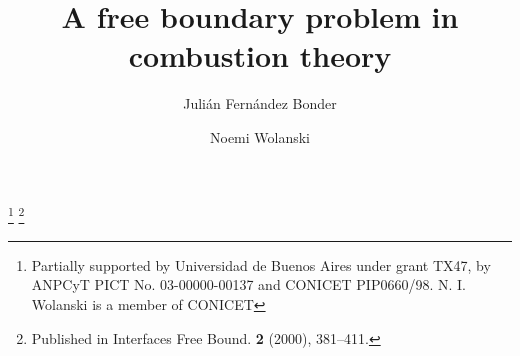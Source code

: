
\vsize=27.9cm
\hsize=21cm
\setlength{\textwidth}{16cm}
\setlength{\textheight}{21.5cm}
\setlength{\oddsidemargin}{0.0cm}
\setlength{\evensidemargin}{0.0cm}
\parskip 6pt
\newcommand{\ve}{\varepsilon}
\newcommand{\car}{{\cal X}}
\newcommand{\R}{{\Bbb R}}
\newcommand{\cald}{{\cal D}}
\newcommand{\bep}{{\cal B}_\ve}
\newcommand{\wep}{w^\ve}
\newcommand{\uep}{u^\ve}
\newcommand{\vep}{v^\ve}
\newcommand{\uepk}{u^{\ve_k}}
\newcommand{\vepk}{v^{\ve_k}}
\newcommand{\wepk}{w^{\ve_k}}
\newcommand{\ep}{\varepsilon}
\newcommand{\epk}{{\ve_k}}
\newcommand{\epn}{\ve_{n}}
\newcommand{\epnk}{\ve_{n_k}}
\newcommand{\uepn}{u^{\ve_{n}}}
\newcommand{\uepnk}{u^{\ve_{n_k}}}
\newcommand{\uepkn}{u^{\ve_{k_n}}}
\newcommand{\vepkn}{v^{\ve_{k_n}}}
\newcommand{\wepkn}{w^{\ve_{k_n}}}
\newcommand{\epkn}{{\ve_{k_n}}}
\newcommand{\bepk}{{\cal B}_{\epk}}
\newcommand{\uepj}{u^{\ve_j}}
\newcommand{\vepj}{v^{\ve_j}}
\newcommand{\wepj}{w^{\ve_j}}
\newcommand{\epj}{{\ve_j}}
\newcommand{\bepj}{{\cal B}_{\epj}}
\newcommand{\vepjn}{v^{\ve_{j_n}}}
\newcommand{\uepjn}{u^{\ve_{j_n}}}
\newcommand{\wepjn}{w^{\ve_{j_n}}}
\newcommand{\epjn}{{\ve_{j_n}}}
\newcommand{\vepjk}{v^{\ve_{j_k}}}
\newcommand{\uepjk}{u^{\ve_{j_k}}}
\newcommand{\wepjk}{w^{\ve_{j_k}}}
\newcommand{\epjk}{{\ve_{j_k}}}
\newcommand{\pepj}{P_{\ve_j}}
\newtheorem{defi}{Definition}[section]
\newtheorem{lema}{Lemma}[section]
\newtheorem{cor}{Corollary}[section]
\newtheorem{prop}{Proposition}[section]
\newtheorem{teo}{Theorem}[section]
\newtheorem{rem}{Remark}[section]
\newtheorem{ack}{Acknowledgements}
\renewcommand{\theack}{}
\renewcommand{\theequation}{\arabic{section}.\arabic{equation}}



\title{\bf A free boundary problem in combustion theory}

\author[J. Fernandez Bonder]{Juli\'an Fern\'andez Bonder}
\author[N. Wolanski]{Noemi  Wolanski}
\thanks{Partially supported by Universidad de Buenos Aires under grant TX47,
by ANPCyT PICT No. 03-00000-00137 and CONICET PIP0660/98.
N. I. Wolanski is a member of CONICET}
\thanks{Published in Interfaces Free Bound. {\bf 2} (2000), 381--411.}
\address{Departamento  de Matem\'atica, FCEyN, UBA (1428) 
Buenos Aires, Argentina.}

